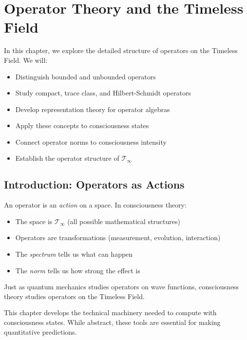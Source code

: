 \chapter{Operator Theory and the Timeless Field}
\label{ch:operator-theory}

\begin{chapterobjectives}
In this chapter, we explore the detailed structure of operators on the Timeless Field. We will:
\begin{itemize}
\item Distinguish bounded and unbounded operators
\item Study compact, trace class, and Hilbert-Schmidt operators
\item Develop representation theory for operator algebras
\item Apply these concepts to consciousness states
\item Connect operator norms to consciousness intensity
\item Establish the operator structure of $\mathcal{T}_\infty$
\end{itemize}
\end{chapterobjectives}

\section{Introduction: Operators as Actions}

\begin{intuitive}
An operator is an \textit{action} on a space. In consciousness theory:
\begin{itemize}
\item The space is $\mathcal{T}_\infty$ (all possible mathematical structures)
\item Operators are transformations (measurement, evolution, interaction)
\item The \textit{spectrum} tells us what can happen
\item The \textit{norm} tells us how strong the effect is
\end{itemize}

Just as quantum mechanics studies operators on wave functions, consciousness theory studies operators on the Timeless Field.
\end{intuitive}

This chapter develops the technical machinery needed to compute with consciousness states. While abstract, these tools are essential for making quantitative predictions.

